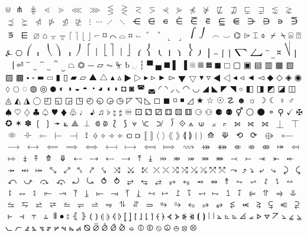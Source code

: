 $⋓$ 
$⋔$ 
$⋕$ 
$⋖$ 
$⋗$ 
$⋘$ 
$⋙$ 
$⋚$ 
$⋛$ 
$⋜$ 
$⋝$ 
$⋞$ 
$⋟$ 
$⋠$ 
$⋡$ 
$⋢$ 
$⋣$ 
$⋤$ 
$⋥$ 
$⋦$ 
$⋧$ 
$⋨$ 
$⋩$ 
$⋪$ 
$⋫$ 
$⋬$ 
$⋭$ 
$⋮$ 
$⋯$ 
$⋰$ 
$⋱$ 
$⋲$ 
$⋳$ 
$⋴$ 
$⋵$ 
$⋶$ 
$⋷$ 
$⋸$ 
$⋹$ 
$⋺$ 
$⋻$ 
$⋼$ 
$⋽$ 
$⋾$ 
$⋿$ 
$⌀$ 
$⌂$ 
$⌅$ 
$⌆$ 
$⌈$ 
$⌉$ 
$⌊$ 
$⌋$ 
$⌐$ 
$⌑$ 
$⌒$ 
$⌓$ 
$⌗$ 
$⌙$ 
$⌜$ 
$⌝$ 
$⌞$ 
$⌟$ 
$⌠$ 
$⌡$ 
$⌢$ 
$⌣$ 
$⌬$ 
$⌲$ 
$⌶$ 
$⌽$ 
$⌿$ 
$⍀$ 
$⍓$ 
$⍰$ 
$⍼$ 
$⎔$ 
$⎛$ 
$⎜$ 
$⎝$ 
$⎞$ 
$⎟$ 
$⎠$ 
$⎡$ 
$⎢$ 
$⎣$ 
$⎤$ 
$⎥$ 
$⎦$ 
$⎧$ 
$⎨$ 
$⎩$ 
$⎪$ 
$⎫$ 
$⎬$ 
$⎭$ 
$⎮$ 
$⎯$ 
$⎰$ 
$⎱$ 
$⎲$ 
$⎳$ 
$⎴$ 
$⎵$ 
$⎶$ 
$⎷$ 
$⎸$ 
$⎹$ 
$⏎$ 
$⏜$ 
$⏝$ 
$⏞$ 
$⏟$ 
$⏠$ 
$⏡$ 
$⏢$ 
$⏣$ 
$⏤$ 
$⏥$ 
$⏦$ 
$⏧$ 
$␢$ 
$␣$ 
$┆$ 
$▀$ 
$▄$ 
$█$ 
$▌$ 
$▐$ 
$░$ 
$▒$ 
$▓$ 
$■$ 
$□$ 
$▢$ 
$▣$ 
$▤$ 
$▥$ 
$▦$ 
$▧$ 
$▨$ 
$▩$ 
$▪$ 
$▫$ 
$▬$ 
$▭$ 
$▮$ 
$▯$ 
$▰$ 
$▱$ 
$▲$ 
$△$ 
$▴$ 
$▵$ 
$▶$ 
$▷$ 
$▸$ 
$▹$ 
$►$ 
$▻$ 
$▼$ 
$▽$ 
$▾$ 
$▿$ 
$◀$ 
$◁$ 
$◂$ 
$◃$ 
$◄$ 
$◅$ 
$◆$ 
$◇$ 
$◈$ 
$◉$ 
$◊$ 
$○$ 
$◌$ 
$◍$ 
$◎$ 
$●$ 
$◐$ 
$◑$ 
$◒$ 
$◓$ 
$◔$ 
$◕$ 
$◖$ 
$◗$ 
$◘$ 
$◙$ 
$◚$ 
$◛$ 
$◜$ 
$◝$ 
$◞$ 
$◟$ 
$◠$ 
$◡$ 
$◢$ 
$◣$ 
$◤$ 
$◥$ 
$◦$ 
$◧$ 
$◨$ 
$◩$ 
$◪$ 
$◫$ 
$◬$ 
$◭$ 
$◮$ 
$◯$ 
$◰$ 
$◱$ 
$◲$ 
$◳$ 
$◴$ 
$◵$ 
$◶$ 
$◷$ 
$◸$ 
$◹$ 
$◺$ 
$◻$ 
$◼$ 
$◽$ 
$◾$ 
$◿$ 
$★$ 
$☆$ 
$☉$ 
$☡$ 
$☻$ 
$☼$ 
$☽$ 
$☾$ 
$♀$ 
$♂$ 
$♠$ 
$♡$ 
$♢$ 
$♣$ 
$♤$ 
$♥$ 
$♦$ 
$♧$ 
$♩$ 
$♪$ 
$♫$ 
$♭$ 
$♮$ 
$♯$ 
$♾$ 
$⚀$ 
$⚁$ 
$⚂$ 
$⚃$ 
$⚄$ 
$⚅$ 
$⚆$ 
$⚇$ 
$⚈$ 
$⚉$ 
$⚥$ 
$⚪$ 
$⚫$ 
$⚬$ 
$⚲$ 
$✓$ 
$✠$ 
$✪$ 
$✶$ 
$✽$ 
$❲$ 
$❳$ 
$➛$ 
$⟀$ 
$⟁$ 
$⟂$ 
$⟃$ 
$⟄$ 
$⟅$ 
$⟆$ 
$⟇$ 
$⟈$ 
$⟉$ 
$⟌$ 
$⟐$ 
$⟑$ 
$⟒$ 
$⟓$ 
$⟔$ 
$⟕$ 
$⟖$ 
$⟗$ 
$⟘$ 
$⟙$ 
$⟚$ 
$⟛$ 
$⟜$ 
$⟝$ 
$⟞$ 
$⟟$ 
$⟠$ 
$⟡$ 
$⟢$ 
$⟣$ 
$⟤$ 
$⟥$ 
$⟦$ 
$⟧$ 
$⟨$ 
$⟩$ 
$⟪$ 
$⟫$ 
$⟬$ 
$⟭$ 
$⟮$ 
$⟯$ 
$⟰$ 
$⟱$ 
$⟲$ 
$⟳$ 
$⟴$ 
$⟵$ 
$⟶$ 
$⟷$ 
$⟸$ 
$⟹$ 
$⟺$ 
$⟻$ 
$⟼$ 
$⟽$ 
$⟾$ 
$⟿$ 
$⤀$ 
$⤁$ 
$⤂$ 
$⤃$ 
$⤄$ 
$⤅$ 
$⤆$ 
$⤇$ 
$⤈$ 
$⤉$ 
$⤊$ 
$⤋$ 
$⤌$ 
$⤍$ 
$⤎$ 
$⤏$ 
$⤒$ 
$⤓$ 
$⤔$ 
$⤕$ 
$⤖$ 
$⤗$ 
$⤘$ 
$⤙$ 
$⤚$ 
$⤛$ 
$⤜$ 
$⤝$ 
$⤞$ 
$⤟$ 
$⤠$ 
$⤡$ 
$⤢$ 
$⤣$ 
$⤤$ 
$⤥$ 
$⤨$ 
$⤩$ 
$⤪$ 
$⤫$ 
$⤬$ 
$⤭$ 
$⤮$ 
$⤯$ 
$⤰$ 
$⤱$ 
$⤲$ 
$⤳$ 
$⤴$ 
$⤵$ 
$⤶$ 
$⤷$ 
$⤸$ 
$⤹$ 
$⤺$ 
$⤻$ 
$⤼$ 
$⤽$ 
$⤾$ 
$⤿$ 
$⥀$ 
$⥁$ 
$⥂$ 
$⥃$ 
$⥄$ 
$⥅$ 
$⥆$ 
$⥇$ 
$⥈$ 
$⥉$ 
$⥊$ 
$⥋$ 
$⥌$ 
$⥍$ 
$⥎$ 
$⥏$ 
$⥐$ 
$⥑$ 
$⥒$ 
$⥓$ 
$⥔$ 
$⥕$ 
$⥖$ 
$⥗$ 
$⥘$ 
$⥙$ 
$⥚$ 
$⥛$ 
$⥜$ 
$⥝$ 
$⥞$ 
$⥟$ 
$⥠$ 
$⥡$ 
$⥢$ 
$⥣$ 
$⥤$ 
$⥥$ 
$⥦$ 
$⥧$ 
$⥨$ 
$⥩$ 
$⥪$ 
$⥫$ 
$⥬$ 
$⥭$ 
$⥮$ 
$⥯$ 
$⥰$ 
$⥱$ 
$⥲$ 
$⥳$ 
$⥴$ 
$⥵$ 
$⥶$ 
$⥷$ 
$⥸$ 
$⥹$ 
$⥺$ 
$⥻$ 
$⥼$ 
$⥽$ 
$⥾$ 
$⥿$ 
$⦀$ 
$⦁$ 
$⦂$ 
$⦃$ 
$⦄$ 
$⦅$ 
$⦆$ 
$⦇$ 
$⦈$ 
$⦉$ 
$⦊$ 
$⦋$ 
$⦌$ 
$⦍$ 
$⦎$ 
$⦏$ 
$⦐$ 
$⦑$ 
$⦒$ 
$⦓$ 
$⦔$ 
$⦕$ 
$⦖$ 
$⦗$ 
$⦘$ 
$⦙$ 
$⦚$ 
$⦛$ 
$⦜$ 
$⦝$ 
$⦞$ 
$⦟$ 
$⦠$ 
$⦡$ 
$⦢$ 
$⦣$ 
$⦤$ 
$⦥$ 
$⦦$ 
$⦧$ 
$⦨$ 
$⦩$ 
$⦪$ 
$⦫$ 
$⦬$ 
$⦭$ 
$⦮$ 
$⦯$ 
$⦰$ 
$⦱$ 
$⦲$ 
$⦳$ 
$⦴$ 
$⦵$ 
$⦶$ 
$⦷$ 
$⦸$ 
$⦹$ 
$⦺$ 
$⦻$ 
$⦼$ 
